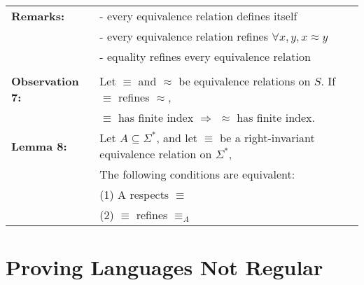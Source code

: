\documentclass[11pt]{article}
\begin{document}
\begin{tabular}{ll}
{\bf Remarks:} & - every equivalence relation defines itself \\
& - every equivalence relation refines $\forall x,y, x \approx y$ \\
& - equality refines every equivalence relation \\
\\
{\bf Observation 7:} & Let $\equiv$ and $\approx$ be equivalence relations on $S$. If $\equiv$ refines $\approx$,\\
& $\equiv$ has finite index $\Rightarrow$ $\approx$ has finite index. \\
{\bf Lemma 8:} & Let $A\subseteq\Sigma^*$, and let $\equiv$ be a right-invariant equivalence relation on $\Sigma^*$,\\
& The following conditions are equivalent: \\
& (1) A respects $\equiv$ \\
& (2) $\equiv$ refines $\equiv_A$ \\
\end{tabular}

\section{Proving Languages Not Regular}
\end{document}
